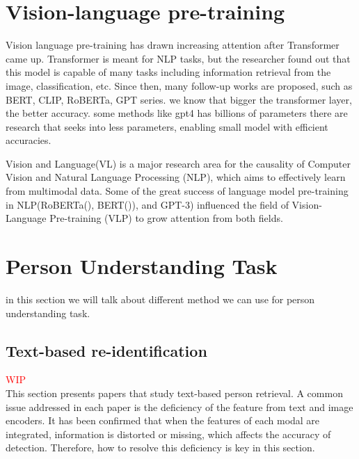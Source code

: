 


\section{Vision-language pre-training}
Vision language pre-training has drawn increasing attention after Transformer came up. Transformer is meant for NLP tasks, but the researcher found out that this model is capable of many tasks including information retrieval from the image, classification, etc. Since then, many follow-up works are proposed, such as BERT, CLIP, RoBERTa, GPT series. 
we know that bigger the transformer layer, the better accuracy. some methods like gpt4 has billions of parameters 
there are research that seeks into less parameters, enabling small model with efficient accuracies.

Vision and Language(VL) is a major research area for the causality of Computer Vision and Natural Language Processing (NLP), which aims to effectively learn from multimodal data. Some of the great success of language model pre-training in NLP(RoBERTa(\cite{liu2020roberta}), BERT(\cite{devlin2018bert})), and GPT-3\cite{brown2020language}) influenced the field of Vision-Language Pre-training (VLP) to grow attention from both fields. 


\section{Person Understanding Task}
in this section we will talk about different method we can use for person understanding task. 
\subsection{Text-based re-identification}
\textcolor{red}{WIP}\\
This section presents papers that study text-based person retrieval. A common issue addressed in each paper is the deficiency of the feature from text and image encoders. It has been confirmed that when the features of each modal are integrated, information is distorted or missing, which affects the accuracy of detection. Therefore, how to resolve this deficiency is key in this section.

